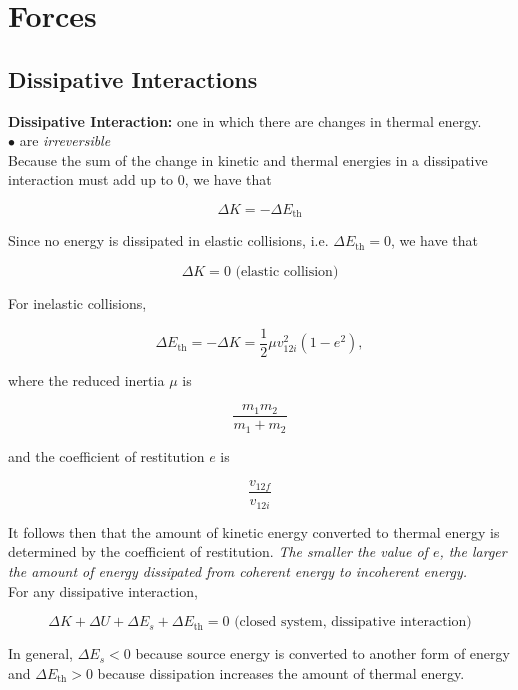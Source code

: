 \section{Forces}

    \subsection{Dissipative Interactions}

        \textbf{Dissipative Interaction:} one in which there are changes in thermal energy. \\
        $\bullet$ are \textit{irreversible} \\

        Because the sum of the change in kinetic and thermal energies in a dissipative interaction must add up to 0, we have that

        \[
            \Delta K = - \Delta E_{\text{th}}
        \]

        Since no energy is dissipated in elastic collisions, i.e. $\Delta E_{\text{th}}=0$, we have that

        \[
            \Delta K = 0 \text{ (elastic collision)}
        \]

        For inelastic collisions,

        \[
            \Delta E_{\text{th}} = -\Delta K = \frac{1}{2}\mu v^2_{12i} (1-e^2),
        \]

        where the reduced inertia $\mu$ is

        \[
            \frac{m_1 m_2}{m_1 + m_2}
        \]

        and the coefficient of restitution $e$ is

        \[
            \frac{v_{12f}}{v_{12i}}
        \]

        It follows then that the amount of kinetic energy converted to thermal energy is determined by the coefficient of restitution. \textit{The smaller the value of $e$, the larger the amount of energy dissipated
        from coherent energy to incoherent energy.} \\

        For any dissipative interaction,

        \[
            \Delta K + \Delta U + \Delta E_s + \Delta E_{\text{th}} = 0 \text{ (closed system, dissipative interaction)}
        \]

        In general, $\Delta E_s < 0$ because source energy is converted to another form of energy and $\Delta E_{\text{th}}>0$ because dissipation increases the amount of thermal energy.





